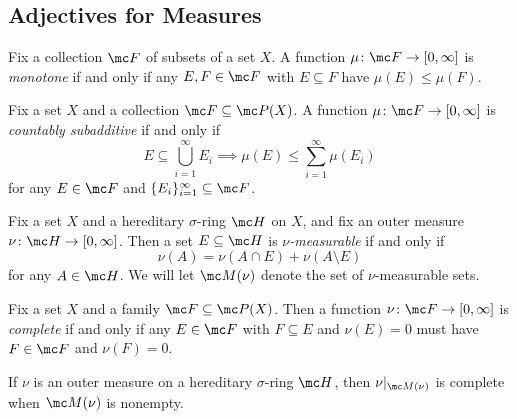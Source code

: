 \documentclass{article}
\begin{document}
\subsection{Adjectives for Measures}
\begin{definition}[Monotone]
	Fix a collection $\mc F$ of subsets of a set $X$. A function $\mu\colon\mc F\to[0,\infty]$ is \textit{monotone} if and only if any $E,F\in\mc F$ with $E\subseteq F$ have $\mu(E)\le\mu(F)$.
\end{definition}
\begin{definition}
	Fix a set $X$ and a collection $\mc F\subseteq\mc P(X)$. A function $\mu\colon\mc F\to[0,\infty]$ is \textit{countably subadditive} if and only if
	\[E\subseteq\bigcup_{i=1}^\infty E_i\implies\mu(E)\le\sum_{i=1}^\infty\mu(E_i)\]
	for any $E\in\mc F$ and $\{E_i\}_{i=1}^\infty\subseteq\mc F$.
\end{definition}
\begin{definition}
	Fix a set $X$ and a hereditary $\sigma$-ring $\mc H$ on $X$, and fix an outer measure $\nu\colon\mc H\to[0,\infty]$. Then a set $E\subseteq\mc H$ is \textit{$\nu$-measurable} if and only if
	\[\nu(A)=\nu(A\cap E)+\nu(A\setminus E)\]
	for any $A\in\mc H$. We will let $\mc M(\nu)$ denote the set of $\nu$-measurable sets.
\end{definition}
\begin{definition}[Compelete]
	Fix a set $X$ and a family $\mc F\subseteq\mc P(X)$. Then a function $\nu\colon\mc F\to[0,\infty]$ is \textit{complete} if and only if any $E\in\mc F$ with $F\subseteq E$ and $\nu(E)=0$ must have $F\in\mc F$ and $\nu(F)=0$.
\end{definition}
\begin{example}
	If $\nu$ is an outer measure on a hereditary $\sigma$-ring $\mc H$, then $\nu|_{\mc M(\nu)}$ is complete when $\mc M(\nu)$ is nonempty.
\end{example}
\end{document}
